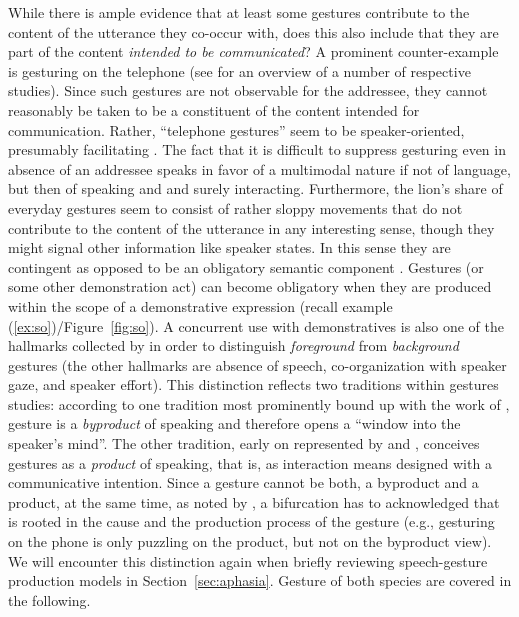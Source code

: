 \documentclass[output=paper]{langsci/langscibook}
\begin{document}
While there is ample evidence that at least some gestures contribute to the content of the utterance they co-occur with, does this also include that they are part of the content \emph{intended to be communicated}?
%
A prominent counter-example is gesturing on the telephone (see \citet{Bavelas:Gerwing:Sutton:Prevost:2008} for an overview of a number of respective studies).
%
Since such gestures are not observable for the addressee, they cannot reasonably be taken to be a constituent of the content intended for communication.
%
Rather, \enquote{telephone gestures} seem to be speaker-oriented, presumably facilitating .
%
The fact that it is difficult to suppress gesturing even in absence of an addressee speaks in favor of a multimodal nature if not of language, but then of speaking and and surely interacting.
%
Furthermore, the lion's share of everyday gestures seem to consist of rather sloppy movements that do not contribute to the content of the utterance in any interesting sense, though they might signal other information like speaker states.
%
In this sense they are contingent  as opposed to be an obligatory  semantic component \citep{Luecking:2013:a}.
%
Gestures (or some other demonstration act) can become obligatory when they are produced within the scope of a demonstrative expression (recall example (\ref{ex:so})/Figure~\ref{fig:so}).
%
A concurrent use with demonstratives is also one of the hallmarks collected by \citet{Cooperrider:2017} in order to distinguish \emph{foreground}  from \emph{background}  gestures (the other hallmarks are absence of speech, co-organization with speaker gaze, and speaker effort).
%
This distinction reflects two traditions within gestures studies: according to one tradition most prominently bound up with the work of \citet{McNeill:1992}, gesture is a \emph{byproduct}  of speaking and therefore opens a \enquote{window into the speaker's mind}.
%
The other tradition, early on represented by \citet{Goodwin:2003} and \citet{Clark:1996}, conceives gestures as a \emph{product}  of speaking, that is, as interaction means designed with a communicative intention.
%
Since a gesture cannot be both, a byproduct and a product, at the same time, as noted by \citet{Cooperrider:2017}, a bifurcation has to acknowledged that is rooted in the cause and the production process of the gesture (e.g., gesturing on the phone is only puzzling on the product, but not on the byproduct view). 
%
We will encounter this distinction again when briefly reviewing speech-gesture production models in Section~\ref{sec:aphasia}.
%
Gesture of both species are covered in the following.
\end{document}
